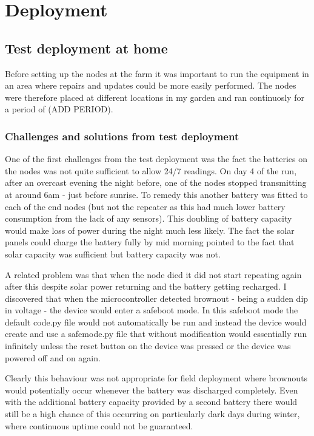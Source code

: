 \section{Deployment}

\subsection{Test deployment at home}

Before setting up the nodes at the farm it was important to run the equipment in
an area where repairs and updates could be more easily performed. The nodes were
therefore placed at different locations in my garden and ran continuosly for a
period of (ADD PERIOD).

\subsubsection{Challenges and solutions from test deployment}

One of the first challenges from the test deployment was the fact the batteries
on the nodes was not quite sufficient to allow 24/7 readings. On day 4 of the
run, after an overcast evening the night before, one of the nodes stopped
transmitting at around 6am - just before sunrise. To remedy this another battery
was fitted to each of the end nodes (but not the repeater as this had much lower
battery consumption from the lack of any sensors). This doubling of battery
capacity would make loss of power during the night much less likely. The fact
the solar panels could charge the battery fully by mid morning pointed to the
fact that solar capacity was sufficient but battery capacity was not.

A related problem was that when the node died it did not start repeating again
after this despite solar power returning and the battery getting recharged. I
discovered that when the microcontroller detected brownout - being a sudden dip
in voltage - the device would enter a safeboot mode. In this safeboot mode the
default code.py file would not automatically be run and instead the device would
create and use a safemode.py file that without modification would essentially
run infinitely unless the reset button on the device was pressed or the device
was powered off and on again.

Clearly this behaviour was not appropriate for field deployment where brownouts
would potentially occur whenever the battery was discharged completely. Even
with the additional battery capacity provided by a second battery there would
still be a high chance of this occurring on particularly dark days during
winter, where continuous uptime could not be guaranteed.

